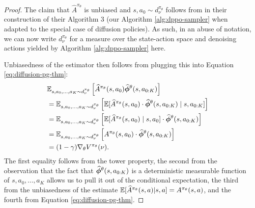 \begin{proof}
    The claim that $\widehat{A}^{\pi_\theta}$ is unbiased and $s, a_0 \sim d_{\nu}^{\pi_\theta}$ follows from \citet{agarwal2021theory} in their construction of their Algorithm 3 (our Algorithm \ref{alg:dppo-sampler} when adapted to the special case of diffusion policies). As such, in an abuse of notation, we can now write $d_{\nu}^{\pi_\theta}$ for a measure over the state-action space and denoising actions yielded by Algorithm \ref{alg:dppo-sampler} here. 
    
    Unbiasedness of the estimator then follows from plugging this into Equation \ref{eq:diffusion-pg-thm}:
    \begin{align}
        &\mathbb{E}_{s,a_0,...,a_K \sim d_{\nu}^{\pi_\theta}}\left[\widehat{A}^{\pi_\theta}(s, a_0)\widehat{\boldsymbol{\phi}}^{\theta}(s, a_{0:K})\right] \\
        &=  \mathbb{E}_{s,a_0,...,a_K \sim d_{\nu}^{\pi_\theta}}\left[\mathbb{E}[\widehat{A}^{\pi_\theta}(s, a_0) \cdot \widehat{\boldsymbol{\phi}}^{\theta}(s, a_{0:K})  \mid s, a_{0:K}]\right] \\
        &=  \mathbb{E}_{s,a_0,...,a_K \sim d_{\nu}^{\pi_\theta}}\left[\mathbb{E}[\widehat{A}^{\pi_\theta}(s, a_0) \mid s, a_0] \cdot \widehat{\boldsymbol{\phi}}^{\theta}(s, a_{0:K})\right] \\
        &= \mathbb{E}_{s,a_0,...,a_K \sim d_{\nu}^{\pi_\theta}}\left[A^{\pi_\theta}(s, a_0) \cdot \widehat{\boldsymbol{\phi}}^{\theta}(s, a_{0:K})\right] \\
        &= (1-\gamma)\nabla_\theta V^{\pi_\theta}(\nu).
    \end{align}
    The first equality follows from the tower property, the second from the observation that the fact that $\widehat{\boldsymbol{\phi}}^{\theta}(s, a_{0:K}) $ is a deterministic measurable function of $s, a_0,...,a_K$ allows us to pull it out of the conditional expectation, the third from the unbiasedness of the estimate $\mathbb{E}[\widehat{A}^{\pi_\theta}(s,a) | s,a] = A^{\pi_\theta}(s,a)$, and the fourth from Equation \ref{eq:diffusion-pg-thm}.


\end{proof}
